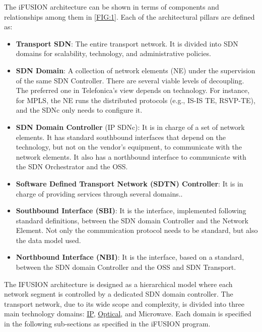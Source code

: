 \documentclass[a4paper,fleqn]{cas-dc}
\begin{document}
The i\uppercase{FUSION} architecture can be shown in terms of components and relationships among them in \cref{FIG:1}. Each of the architectural pillars are defined as:

\begin{itemize}
\item \textbf{Transport SDN}: The entire transport network. It is divided into SDN domains for scalability, technology, and administrative policies.

\item \textbf{SDN Domain}: A collection of network elements (NE) under the supervision of the same SDN Controller. There are several viable levels of decoupling. The preferred one in Telefonica's view depends on technology. For instance, for MPLS, the NE runs the distributed protocols (e.g., IS-IS TE, RSVP-TE), and the SDNc only needs to configure it.

\item \textbf{SDN Domain Controller} (IP SDNc): It is in charge of a set of network elements. It has standard southbound interfaces that depend on the technology, but not on the vendor's equipment, to communicate with the network elements. It also has a northbound interface to communicate with the SDN Orchestrator and the OSS.

\item \textbf{Software Defined Transport Network (SDTN) Controller}: It is in charge of providing services through several domains.. 

\item \textbf{Southbound Interface (SBI)}: It is the interface, implemented following standard definitions, between the SDN domain Controller and the Network Element. Not only the communication protocol needs to be standard, but also the data model used.

\item \textbf{Northbound Interface (NBI)}: It is the interface, based on a standard, between the SDN domain Controller and the OSS and SDN Transport.

\end{itemize}

The \uppercase{iFUSION} architecture is designed as a hierarchical model where each network segment is controlled by a dedicated SDN domain controller. The transport network, due to its wide scope and complexity, is divided into three main technology domains: \hyperref[section:ip]{IP},  \hyperref[section:dwdm]{Optical}, and Microwave. Each domain is specified in the following sub-sections as specified in the i\uppercase{FUSION} program.   
\end{document}
